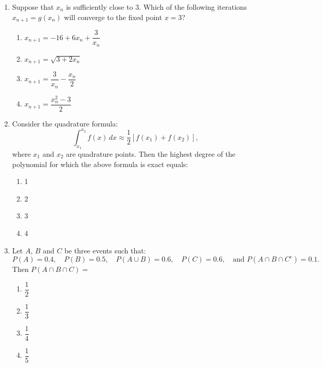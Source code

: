 \documentclass[journal]{IEEEtran}
\numberwithin{equation}{enumi}
\numberwithin{figure}{enumi}
\begin{document}
\begin{enumerate}
\item Suppose that $x_n$ is sufficiently close to 3. Which of the following iterations $x_{n+1} = g(x_n)$ will converge to the fixed point $x = 3$?
\hfill{}
\begin{multicols}{2}
    \begin{enumerate}
        \item $x_{n+1} = -16 + 6x_n + \dfrac{3}{x_n}$
        \item $x_{n+1} = \sqrt{3 + 2x_n}$
        \item $x_{n+1} = \dfrac{3}{x_n} - \dfrac{x_n}{2}$
        \item $x_{n+1} = \dfrac{x_n^2 - 3}{2}$
    \end{enumerate}
    \end{multicols}


\item Consider the quadrature formula:
    \[
    \int_{x_1}^{x_2} f(x)\, dx \approx \dfrac{1}{2} \left[f(x_1) + f(x_2)\right],
    \]
    where $x_1$ and $x_2$ are quadrature points. Then the highest degree of the polynomial for which the above formula is exact equals: 
    \hfill{}
   \begin{multicols}{4}
\begin{enumerate}
    \item 1
    \item 2
    \item 3
    \item 4
\end{enumerate}
\end{multicols}
     

\item Let $A$, $B$ and $C$ be three events such that:
    \[
    P(A) = 0.4,\quad P(B) = 0.5,\quad P(A \cup B) = 0.6,\quad P(C) = 0.6,\quad \text{and } P(A \cap B \cap C^c) = 0.1.
    \]
    Then $P(A \cap B \cap C) =$
    \hfill{}
\begin{multicols}{4}
\begin{enumerate}
    \item $\dfrac{1}{2}$
    \item  $\dfrac{1}{3}$
    \item $\dfrac{1}{4}$
    \item $\dfrac{1}{5}$  
\end{enumerate}
\end{multicols}
        


\end{enumerate}
\end{document}
